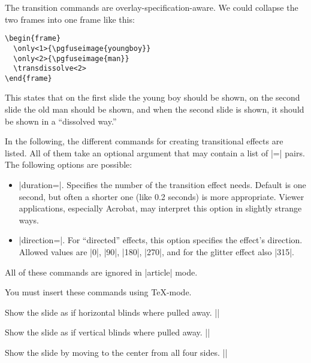 The transition commands are overlay-specification-aware. We could
collapse the two frames into one frame like this:
\begin{verbatim}
\begin{frame}
  \only<1>{\pgfuseimage{youngboy}}
  \only<2>{\pgfuseimage{man}}
  \transdissolve<2>
\end{frame}
\end{verbatim}
This states that on the first slide the young boy should be shown, on
the second slide the old man should be shown, and when the second
slide is shown, it should be  shown in a ``dissolved way.''

In the following, the different commands for creating transitional
effects are listed. All of them take an optional argument that may
contain a list of |=| pairs. The following
options are possible:

\begin{itemize}
\item
  |duration=|. Specifies the number of 
  the transition effect needs. Default is one second, but often a
  shorter one (like 0.2 seconds) is more appropriate. Viewer
  applications, especially Acrobat, may interpret this option in
  slightly strange ways.
\item
  |direction=|. For ``directed'' effects, this option
  specifies the effect's direction. Allowed values are |0|, |90|,
  |180|, |270|, and for the glitter effect also |315|.
\end{itemize}

\articlenote
All of these commands are ignored in |article| mode.

\lyxnote
You must insert these commands using \TeX-mode.

\begin{command}{\transblindshorizontal{}}
  Show the slide as if horizontal blinds where pulled away.
  \example|\transblindshorizontal|
\end{command}

\begin{command}{\transblindsvertical{}}
  Show the slide as if vertical blinds where pulled away.
  \example||
\end{command}

\begin{command}{\transboxin{}}
  Show the slide by moving to the center from all four sides.
  \example||
\end{command}

